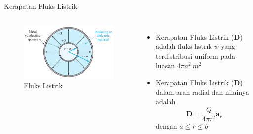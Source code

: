 \documentclass[10pt]{beamer}
\begin{document}
\begin{frame}{Kerapatan Fluks Listrik}
    \begin{columns}[T,onlytextwidth]
        \begin{figure}
            \includegraphics[width=\linewidth]{chap03/electric-flux.png}
            \caption{Fluks Listrik}
        \end{figure}

        \begin{itemize}
            \item Kerapatan Fluks Listrik ($\textbf{D}$) adalah fluks listrik $\psi$ yang terdistribusi uniform pada luasan $4\pi a^2~m^2$
            \item Kerapatan Fluks Listrik ($\textbf{D}$) dalam arah radial dan nilainya adalah
            \begin{equation}
                \textbf{D} = \frac{Q}{4 \pi r^2}\textbf{a}_r
            \end{equation}
            dengan $a \leq r \leq b$
        \end{itemize}
    \end{columns}
\end{frame}
\end{document}
